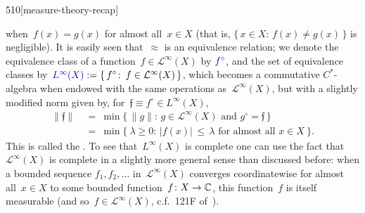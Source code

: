\begin{parsec}{510}[measure-theory-recap]
\begin{point}{50}
when~$f(x)=g(x)$ for almost all~$x\in X$
(that is, $\{\,x\in X\colon\, f(x)\neq g(x)\,\}$
is negligible).
It is easily seen that~$\approx$ is an equivalence relation;
we denote the equivalence class
of a function~$f\in \mathcal{L}^\infty(X)$
by $\Define{f^\circ}$,%
and
the set of equivalence classes by~$\Define{L^\infty(X)}
:= \{\, f^\circ\colon\, f\in \mathcal{L}^\infty(X)\,\}$,
which
becomes a commutative $C^*$-algebra
when
endowed with the same operations
as~$\mathcal{L}^\infty(X)$, but with
a slightly modified norm given by,
for~$\mathfrak{f}\equiv f^\circ \in L^\infty(X)$,
\begin{alignat*}{3}
	\|\mathfrak{f}\| \ &= \ 
\min\{\, \|g\|\colon \, g\in\mathcal{L}^\infty(X)\text{ and }
g^\circ = \mathfrak{f}\,\} \\
&=\ \min\{\ \lambda\geq 0\colon\,
		\left|f(x)\right|\,\leq\,\lambda
	\text{ for almost all~$x\in X$}\ \}.
\end{alignat*}
This is called the .%
To see that~$L^\infty(X)$ is complete
one can use the fact that~$\mathcal{L}^\infty(X)$
is complete in a slightly more general sense than discussed before:
when a bounded sequence $f_1,f_2,\dotsc$
in~$\mathcal{L}^\infty(X)$
converges coordinatewise for almost all~$x\in X$
to some bounded function~$f\colon X\to\mathbb{C}$,
this function~$f$ is itself measurable (and so~$f\in\mathcal{L}^\infty(X)$,
c.f.~121F of~\cite{fremlin}).


\end{point}
\end{parsec}
